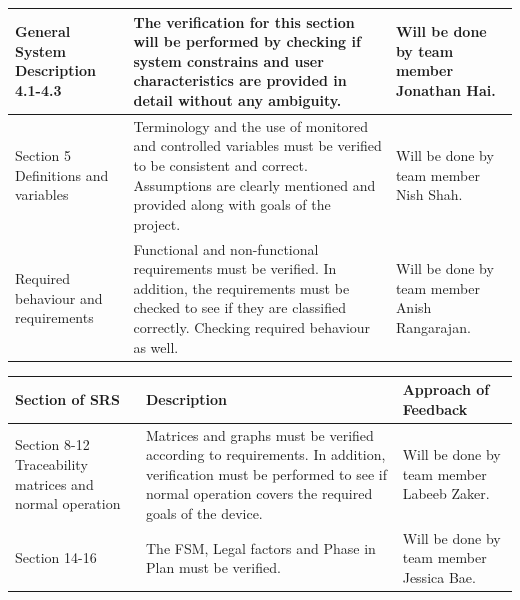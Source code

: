 \documentclass[12pt, titlepage]{article}
\begin{document}
\begin{center}
\begin{tabular}{|m{3cm}|m{8cm}|m{4cm}|}
    \hline
    General System Description 4.1-4.3                      & The verification for this section will be performed by checking if system constrains and user characteristics are provided in detail without any ambiguity.                                       & Will be done by team member Jonathan Hai.                                                    \\
    \hline
    Section 5 Definitions and variables                     &  Terminology and the use of monitored and controlled variables must be verified to be consistent and correct. Assumptions are clearly mentioned and provided along with goals of the project. & Will be done by team member  Nish Shah.                                                      \\
    \hline
    Required behaviour and requirements                      & Functional and non-functional requirements must be verified. In addition, the requirements must be checked to see if they are classified correctly. Checking required behaviour as well.                              & Will be done by team member Anish Rangarajan.                                                \\
    \hline
  \end{tabular}
\end{center}

\begin{center}
  \begin{tabular}{|m{3cm}|m{8cm}|m{4cm}|}
    \hline
    \textbf{Section of SRS}                                 & \textbf{Description}                                                                                                                                                                  & \textbf{Approach of Feedback}
    \\
    \hline
    Section 8-12 Traceability matrices and normal operation &  Matrices and graphs must be verified according to requirements. In addition, verification must be performed to see if normal operation covers the required goals of the device.                                         & Will be done by team member Labeeb Zaker.                                                    \\
    \hline
    Section 14-16                                           & The FSM, Legal factors and Phase in Plan must be verified.                                                                                                                                 & Will be done by team member Jessica Bae.                                                     \\
    \hline
  \end{tabular}
\end{center}
\end{document}
